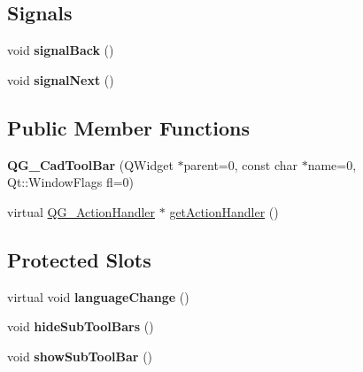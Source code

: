 \subsection*{Signals}
\begin{DoxyCompactItemize}
\item 
\hypertarget{classQG__CadToolBar_abdfeea72ca6134d24db7f39c979fc207}{void {\bfseries signal\-Back} ()}\label{classQG__CadToolBar_abdfeea72ca6134d24db7f39c979fc207}

\item 
\hypertarget{classQG__CadToolBar_a92dcc3f99868c690b92fe6b094fc8c0b}{void {\bfseries signal\-Next} ()}\label{classQG__CadToolBar_a92dcc3f99868c690b92fe6b094fc8c0b}

\end{DoxyCompactItemize}
\subsection*{Public Member Functions}
\begin{DoxyCompactItemize}
\item 
\hypertarget{classQG__CadToolBar_ada23d0871aa1cffd89ca633001e4218d}{{\bfseries Q\-G\-\_\-\-Cad\-Tool\-Bar} (Q\-Widget $\ast$parent=0, const char $\ast$name=0, Qt\-::\-Window\-Flags fl=0)}\label{classQG__CadToolBar_ada23d0871aa1cffd89ca633001e4218d}

\item 
virtual \hyperlink{classQG__ActionHandler}{Q\-G\-\_\-\-Action\-Handler} $\ast$ \hyperlink{classQG__CadToolBar_a6581aa8f3418164a22a118883dd45d69}{get\-Action\-Handler} ()
\end{DoxyCompactItemize}
\subsection*{Protected Slots}
\begin{DoxyCompactItemize}
\item 
\hypertarget{classQG__CadToolBar_a269d045b40c883fb08ebd421832b0df8}{virtual void {\bfseries language\-Change} ()}\label{classQG__CadToolBar_a269d045b40c883fb08ebd421832b0df8}

\item 
\hypertarget{classQG__CadToolBar_a5ffc6ffe854969bf04cbbdd849d6c870}{void {\bfseries hide\-Sub\-Tool\-Bars} ()}\label{classQG__CadToolBar_a5ffc6ffe854969bf04cbbdd849d6c870}

\item 
\hypertarget{classQG__CadToolBar_a90e0c2c7f5d46f33e7044b7be14d0f90}{void {\bfseries show\-Sub\-Tool\-Bar} ()}\label{classQG__CadToolBar_a90e0c2c7f5d46f33e7044b7be14d0f90}

\end{DoxyCompactItemize}
